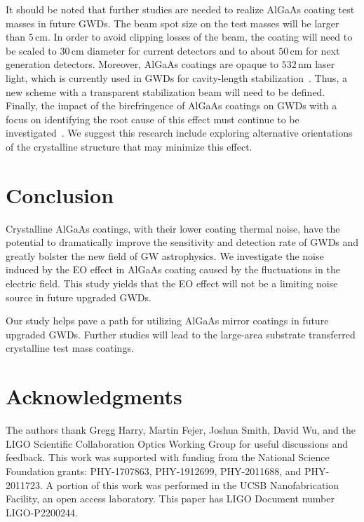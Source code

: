 It should be noted that further studies are needed to realize AlGaAs coating test masses in future GWDs.
The beam spot size on the test masses will be larger than $5\, \mathrm{cm}$.
In order to avoid clipping losses of the beam, the coating will need to be scaled to $30\, \mathrm{cm}$ diameter for current detectors and to about $50\, \mathrm{cm}$ for next generation detectors.
Moreover, AlGaAs coatings are opaque to $532\, \mathrm{nm}$ laser light, which is currently used in GWDs for cavity-length stabilization~\cite{Izumi2012, Staley2014}.
Thus, a new scheme with a transparent stabilization beam will need to be defined.
Finally, the impact of the birefringence of AlGaAs coatings on GWDs with a focus on identifying the root cause of this effect must continue to be investigated~\cite{Winkler2021, Michimura2022, Yu2022}.
We suggest this research include exploring alternative orientations of the crystalline structure that may minimize this effect.


\section{Conclusion}

Crystalline AlGaAs coatings, with their lower coating thermal noise, have the potential to dramatically  improve the sensitivity and detection rate of GWDs and greatly bolster the new field of GW astrophysics.
We investigate the noise induced by the EO effect in AlGaAs coating caused by the fluctuations in the electric field.
This study yields that the EO effect will not be a limiting noise source in future upgraded GWDs.

Our study helps pave a path for utilizing AlGaAs mirror coatings in future upgraded GWDs.
Further studies will lead to the large-area substrate transferred crystalline test mass coatings.

\section{Acknowledgments}
The authors thank Gregg Harry, Martin Fejer, Joshua Smith, David Wu, and the LIGO Scientific Collaboration Optics Working Group for useful discussions and feedback.
This work was supported with funding from the National Science Foundation grants:  PHY-1707863, PHY-1912699, PHY-2011688, and PHY-2011723. 
A portion of this work was performed in the UCSB Nanofabrication Facility, an open access laboratory.
This paper has LIGO Document number LIGO-P2200244.




